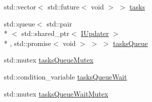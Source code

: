 \begin{DoxyCompactItemize}
\item 
std\-::vector$<$ std\-::future$<$ void $>$ $>$ \hyperlink{struct_threaded_chunked_temperature_world_updater_1_1_thread_data_ab084ac0c15a2536095bef8c9297361f5}{tasks}
\item 
std\-::queue$<$ std\-::pair\\*
$<$ std\-::shared\-\_\-ptr$<$ \hyperlink{class_i_updater}{I\-Updater} $>$\\*
, std\-::promise$<$ void $>$ $>$ $>$ \hyperlink{struct_threaded_chunked_temperature_world_updater_1_1_thread_data_ac72652dd6c97da60b3d4d1415ddb6f3d}{tasks\-Queue}
\item 
std\-::mutex \hyperlink{struct_threaded_chunked_temperature_world_updater_1_1_thread_data_a79a7bd3c8bcb2441418511bd54bf52ce}{tasks\-Queue\-Mutex}
\item 
std\-::condition\-\_\-variable \hyperlink{struct_threaded_chunked_temperature_world_updater_1_1_thread_data_a177bfecc3ca2c821c762743d36abc0ae}{tasks\-Queue\-Wait}
\item 
std\-::mutex \hyperlink{struct_threaded_chunked_temperature_world_updater_1_1_thread_data_ae7997a285fb8f3215745638c8201207e}{tasks\-Queue\-Wait\-Mutex}
\end{DoxyCompactItemize}


